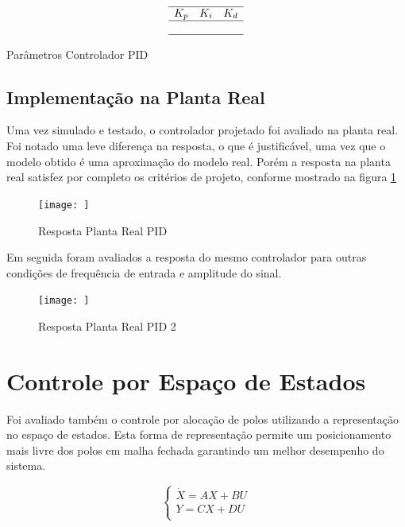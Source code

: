 \documentclass[a4paper,11pt]{article}
\begin{document}
\begin{table}[H]
    \centering
    $$\begin{array}{ccc}
    \hline
        K_p & K_i & K_d\\
    \hline
         &  &\\
     \hline
    \end{array}$$
    \caption{Parâmetros Controlador PID}
    \label{tab:pid_param}
\end{table}


\subsection{Implementação na Planta Real}

Uma vez simulado e testado, o controlador projetado foi avaliado na planta real. Foi notado uma leve diferença na resposta, o que é justificável, uma vez que o modelo obtido é uma aproximação do modelo real. Porém a resposta na planta real satisfez por completo os critérios de projeto, conforme mostrado na figura \ref{fig:quaser_pid}

\begin{figure}[H]
    \centering
    \texttt{[image: ]}
    \caption{Resposta Planta Real PID}
    \label{fig:quaser_pid}
\end{figure}

Em seguida foram avaliados a resposta do mesmo controlador para outras condições de frequência de entrada e amplitude do sinal.

\begin{figure}[H]
    \centering
    \texttt{[image: ]}
    \caption{Resposta Planta Real PID 2}
    \label{fig:quaser_pid2}
\end{figure}

\section{Controle por Espaço de Estados}

Foi avaliado também o controle por alocação de polos utilizando a representação no espaço de estados. Esta forma de representação permite um posicionamento mais livre dos polos em malha fechada garantindo um melhor desempenho do sistema.

\begin{equation}
\left\{
\begin{array}{c}
    \dot{X} = A X + B U \\
    Y = C X + D U \\
\end{array}
\right.
\end{equation}
\end{document}
